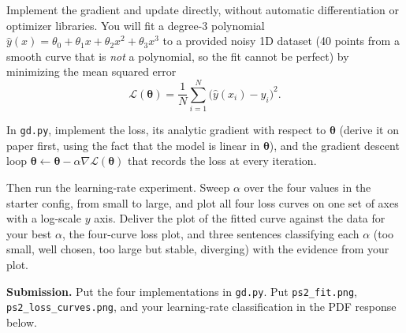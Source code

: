 \documentclass[11pt]{article}
\newcommand{\loss}{\mathcal{L}}         %
\newcommand{\lr}{\alpha}                %
\newcommand{\params}{\bm{\theta}}       %
\begin{document}
Implement the gradient and update directly, without automatic
differentiation or optimizer libraries. You will fit a degree-3 polynomial
$\hat{y}(x) = \theta_0 + \theta_1 x + \theta_2 x^2 + \theta_3 x^3$ to a
provided noisy 1D dataset (40 points from a smooth curve that is
\emph{not} a polynomial, so the fit cannot be perfect) by minimizing the
mean squared error
\[
\loss(\params) = \frac{1}{N}\sum_{i=1}^{N}\bigl(\hat{y}(x_i) - y_i\bigr)^2 .
\]

In \texttt{gd.py}, implement the loss, its analytic gradient with
respect to $\params$ (derive it on paper first, using the fact that the model is linear in
$\params$), and the gradient descent
loop $\params \leftarrow \params - \lr \nabla\loss(\params)$ that records
the loss at every iteration.

Then run the learning-rate experiment. Sweep $\lr$ over the four values in
the starter config, from small to large, and plot all four loss curves
on one set of axes with a log-scale $y$ axis. Deliver the plot of the
fitted curve against the data for your best $\lr$, the four-curve loss
plot, and three sentences classifying each $\lr$ (too small, well chosen,
too large but stable, diverging) with the evidence from your plot.

\textbf{Submission.} Put the four implementations in
\texttt{gd.py}. Put \texttt{ps2\_fit.png},
\texttt{ps2\_loss\_curves.png}, and your learning-rate classification in
the PDF response below.
\end{document}

